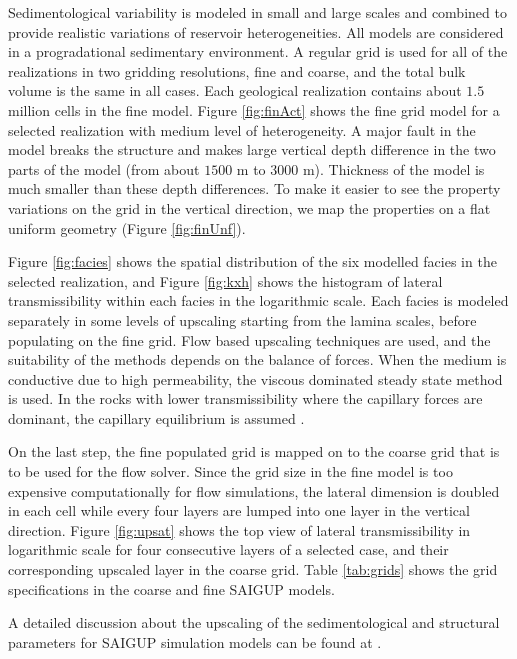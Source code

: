 Sedimentological variability is modeled in small and large scales and combined
to provide realistic variations of reservoir heterogeneities.  All models are considered in a progradational sedimentary environment. A regular grid is used for all of the realizations in two gridding resolutions, fine and coarse, and the total bulk volume is the same in all cases. Each geological realization contains about $1.5$ million cells in the fine model. Figure \ref{fig:finAct} shows the fine grid model for a selected realization with medium level of heterogeneity. A major fault in the model breaks the structure and makes large vertical depth difference in the two parts of the model (from about $1500$ m to $3000$ m).  Thickness of the model is much smaller than these depth differences. To make it easier to see the property variations on the grid in the vertical direction, we map the properties on a flat uniform geometry (Figure \ref{fig:finUnf}).

Figure \ref{fig:facies} shows the spatial distribution of the six modelled facies in the selected realization, and Figure \ref{fig:kxh} shows the histogram of lateral transmissibility within each facies in the logarithmic scale. Each facies is modeled separately in some levels of upscaling starting from the lamina scales, before populating on the fine grid. Flow based upscaling techniques are used, and the suitability of the methods depends on the balance of
forces. When the medium is conductive due to high permeability, the viscous dominated steady state method is used. In the rocks with lower transmissibility where the capillary forces are dominant, the capillary equilibrium is assumed \cite{manzocchi2008sensitivity}.

On the last step, the fine populated grid is mapped on to the coarse grid that is to be used for the flow solver. Since the grid size in the fine model is too expensive computationally for flow simulations, the lateral dimension is doubled in each cell while every four layers are lumped into one layer in the vertical direction. Figure \ref{fig:upsat} shows the top view of lateral transmissibility in logarithmic scale for four consecutive layers of a selected case, and their corresponding upscaled layer in the coarse grid. Table \ref{tab:grids} shows the grid specifications in the coarse and fine SAIGUP models.

A detailed discussion about the upscaling of the sedimentological and structural parameters for SAIGUP simulation models can be found at \cite{manzocchi2008sensitivity}.

